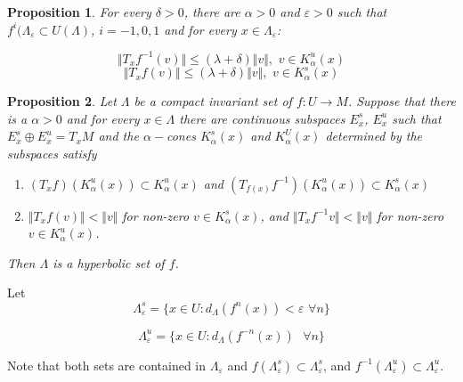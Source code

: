 \documentclass{article}
\newtheorem{prop}{Proposition}
\begin{document}
\begin{prop}

For every $\delta > 0$, there are $\alpha > 0$ and $\varepsilon > 0$ such that $f^i(\Lambda_{\varepsilon} \subset U(\Lambda)$, $i=-1,0,1$ and for every $x \in \Lambda_{\varepsilon}$:

\[\Vert T_xf^{-1}(v) \Vert \leq (\lambda + \delta) \Vert v \Vert,\hspace{4pt} v \in K^u_{\alpha}(x)\]
\[\Vert T_x f (v) \Vert \leq (\lambda + \delta) \Vert v \Vert, \hspace{4pt} v \in K^s_{\alpha}(x)\]
\end{prop}

\begin{prop}
Let $\Lambda$ be a compact invariant set of $f:U \to M$. Suppose that there is a $\alpha > 0$ and for every $x \in \Lambda$ there are continuous subspaces $E^s_x$, $E^u_x$ such that $E^s_x \oplus E^u_x = T_xM$ and the $\alpha-$cones $K^s_{\alpha}(x)$ and $K^U_{\alpha}(x)$ determined by the subspaces satisfy

\begin{enumerate}
    \item $(T_xf)(K^u_{\alpha}(x)) \subset K^u_{\alpha}(x) $ and $ (T_{f(x)}f^{-1})(K^u_{\alpha}(x)) \subset K^s_{\alpha}(x) $
    \item $\Vert T_xf(v) \Vert < \Vert v \Vert$ for non-zero $v \in K^s_{\alpha}(x)$, and $\Vert T_xf^{-1} v \Vert < \Vert v \Vert$ for non-zero $v \in K^u_{\alpha}(x)$.
\end{enumerate}

Then $\Lambda$ is a hyperbolic set of $f$. 

\end{prop}

Let 
\[\Lambda^s_{\varepsilon}=\{ x \in U: d_{\Lambda}(f^n(x)) < \varepsilon \hspace{4pt} \forall n \}\]

\[\Lambda^u_{\varepsilon} = \{ x \in U: d_{\Lambda}(f^{-n}(x)) \hspace{4pt} \hspace{4pt} \forall n \}\]

\indent Note that both sets are contained in $\Lambda_{\varepsilon}$ and $f(\Lambda^s_{\varepsilon}) \subset \Lambda^s_{\varepsilon}$, and $f^{-1}(\Lambda^u_{\varepsilon}) \subset \Lambda^u_{\varepsilon}$.
\end{document}
